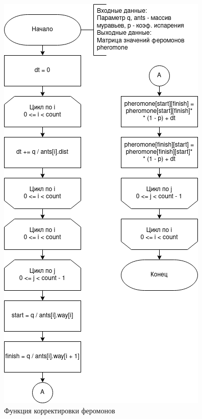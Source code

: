 \begin{figure}[H]
	\begin{center}
		\includegraphics[scale=0.6]{assets/cor_pher.png}
	\end{center}
	\caption{Функция корректировки феромонов}
\end{figure}

